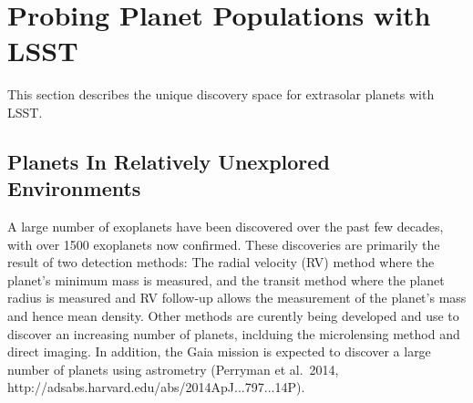 
%
%
%
%
%
%

\section{Probing Planet Populations with LSST}
\def\secname{planets}\label{sec:\secname}



This section describes the unique discovery space for extrasolar planets with LSST.

\subsection{Planets In Relatively Unexplored Environments}
A large number of exoplanets have been discovered over the past few decades, with over 1500 exoplanets now confirmed. These discoveries are primarily the result of two detection methods: The radial velocity (RV) method where the planet's minimum mass is measured, and the transit method where the planet radius is measured and RV follow-up allows the measurement of the planet's mass and hence mean density. Other methods are curently being developed and use to discover an increasing number of planets, inclduing the microlensing method and direct imaging. In addition, the Gaia mission is expected to discover a large number of planets using astrometry (Perryman et al.~2014, http://adsabs.harvard.edu/abs/2014ApJ...797...14P).

